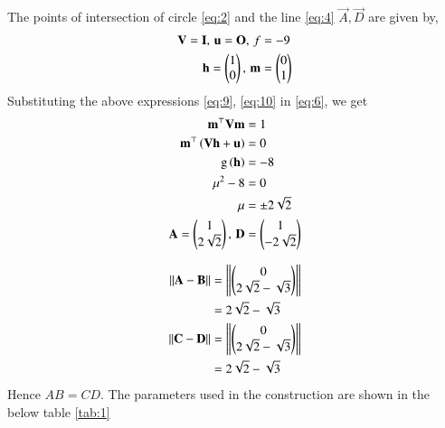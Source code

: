 \documentclass[journal,12pt,twocolumn]{IEEEtran}
\begin{document}
\begin{enumerate}
The points of intersection of circle \eqref{eq:2} and the line \eqref{eq:4} $\vec{A},\vec{D}$ are given by,
\begin{align}
\mathbf{V} = \mathbf{I}, \, \mathbf{u} = \mathbf{O}, \, f &= -9
\label{eq:9}\\
\mathbf{h} = \begin{pmatrix}1\\0\end{pmatrix}, \, \mathbf{m} &= \begin{pmatrix}0\\1\end{pmatrix}
\label{eq:10}
\end{align} 
Substituting the above expressions \eqref{eq:9}, \eqref{eq:10} in \eqref{eq:6}, we get
\begin{align}
\mathbf{m}^{\top}\mathbf{V}\mathbf{m} & = 1\\
\mathbf{m}^{\top}\left(\mathbf{V}\mathbf{h}+\mathbf{u}\right) &= 0 \\
\text{g}\left(\mathbf{h}\right) &= -8\\
\mu ^2 - 8 &= 0\\
\mu &= \pm 2\sqrt{2}\\
\mathbf{A} = \begin{pmatrix}1\\2\sqrt{2}\end{pmatrix}, \, \mathbf{D} &= \begin{pmatrix}1\\-2\sqrt{2}\end{pmatrix}
\end{align}

\begin{align}
\left\lVert\mathbf{A}-\mathbf{B}\right\rVert &= \left\lVert\begin{pmatrix}0 \\ 2\sqrt{2}-\sqrt{3}\end{pmatrix}\right\rVert\\
&=  2\sqrt{2}-\sqrt{3}\\
\left\lVert\mathbf{C}-\mathbf{D}\right\rVert &= \left\lVert\begin{pmatrix}0 \\ 2\sqrt{2}-\sqrt{3}\end{pmatrix}\right\rVert\\
&=  2\sqrt{2}-\sqrt{3}
\end{align}
Hence $AB = CD$.
The parameters used in the construction are shown in the below table \ref{tab:1}

\begin{table}[h]
\centering

\caption{}
\label{tab:1}
\end{table}
\end{enumerate}
\end{document}
